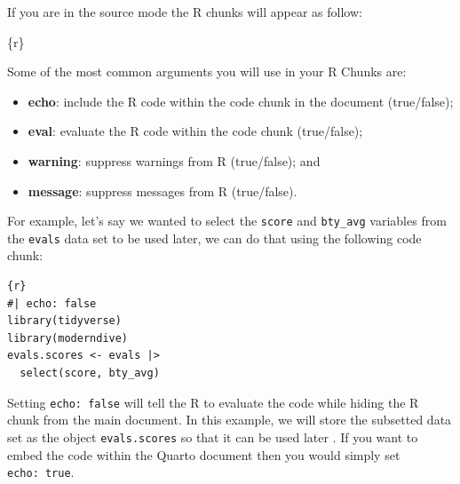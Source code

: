 \documentclass[
  letterpaper,
  DIV=11,
  numbers=noendperiod]{scrartcl}
\newenvironment{Shaded}{\begin{snugshade}}{\end{snugshade}}
\newcommand{\InformationTok}[1]{\textcolor[rgb]{0.37,0.37,0.37}{#1}}
\providecommand{\tightlist}{%
  \setlength{\itemsep}{0pt}\setlength{\parskip}{0pt}}\usepackage{longtable,booktabs,array}
\begin{document}
\begin{tcolorbox}[enhanced jigsaw, colback=white, toprule=.15mm, arc=.35mm, colbacktitle=quarto-callout-note-color!10!white, titlerule=0mm, colframe=quarto-callout-note-color-frame, title=\textcolor{quarto-callout-note-color}{\faInfo}\hspace{0.5em}{Note}, bottomtitle=1mm, toptitle=1mm, coltitle=black, rightrule=.15mm, opacityback=0, bottomrule=.15mm, breakable, leftrule=.75mm, left=2mm, opacitybacktitle=0.6]

\hfill\break
If you are in the source mode the R chunks will appear as follow:

\begin{Shaded}
\begin{Highlighting}[]
\InformationTok{\textasciigrave{}\textasciigrave{}\textasciigrave{}\{r\}}

\InformationTok{\textasciigrave{}\textasciigrave{}\textasciigrave{}}
\end{Highlighting}
\end{Shaded}

\end{tcolorbox}

Some of the most common arguments you will use in your R Chunks are:

\begin{itemize}
\tightlist
\item
  \textbf{echo}: include the R code within the code chunk in the
  document (true/false);
\item
  \textbf{eval}: evaluate the R code within the code chunk (true/false);
\item
  \textbf{warning}: suppress warnings from R (true/false); and
\item
  \textbf{message}: suppress messages from R (true/false).
\end{itemize}

For example, let's say we wanted to select the \texttt{score} and
\texttt{bty\_avg} variables from the \texttt{evals} data set to be used
later, we can do that using the following code chunk:

\begin{verbatim}
{r}
#| echo: false
library(tidyverse)
library(moderndive)
evals.scores <- evals |>
  select(score, bty_avg)
\end{verbatim}

Setting \texttt{echo:\ false} will tell the R to evaluate the code while
hiding the R chunk from the main document. In this example, we will
store the subsetted data set as the object \texttt{evals.scores} so that
it can be used later . If you want to embed the code within the Quarto
document then you would simply set \texttt{echo:\ true}.
\end{document}
